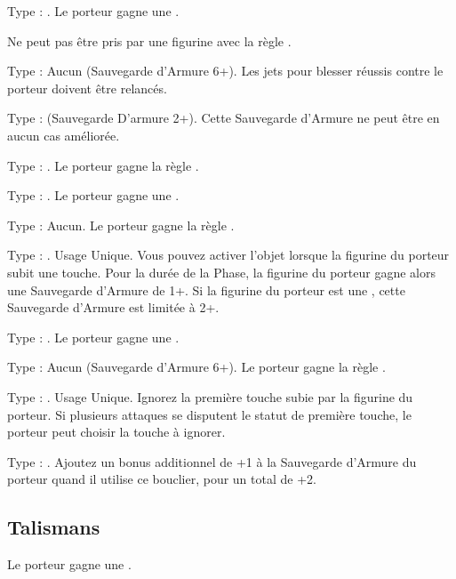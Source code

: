 Type : \ha{}. Le porteur gagne une .

Ne peut pas être pris par une figurine avec la règle \largetarget{}.

Type : Aucun (Sauvegarde d'Armure 6+). Les jets pour blesser réussis contre le porteur doivent être relancés.

Type : \ha{} (Sauvegarde D'armure 2+). Cette Sauvegarde d'Armure ne peut être en aucun cas améliorée.

Type : \ha{}. Le porteur gagne la règle \distracting{}.

Type : \ha{}. Le porteur gagne une .

Type : Aucun. Le porteur gagne la règle .

\columnbreak

Type : \ha{}. Usage Unique. Vous pouvez activer l'objet lorsque la figurine du porteur subit une touche. Pour la durée de la Phase, la figurine du porteur gagne alors une Sauvegarde d'Armure de 1+. Si la figurine du porteur est une \largetarget{}, cette Sauvegarde d'Armure est limitée à 2+.

Type : \ha{}. Le porteur gagne une .

Type : Aucun (Sauvegarde d'Armure 6+). Le porteur gagne la règle \fireborn{}.

Type : \shield{}. Usage Unique. Ignorez la première touche subie par la figurine du porteur. Si plusieurs attaques se disputent le statut de première touche, le porteur peut choisir la touche à ignorer.

Type : \shield{}. Ajoutez un bonus additionnel de +1 à la Sauvegarde d'Armure du porteur quand il utilise ce bouclier, pour un total de +2.

\endpricelist

\newpage
\subsection{Talismans}

\startpricelist

Le porteur gagne une .

